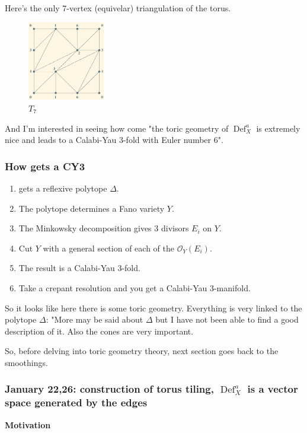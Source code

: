Here's the only 7-vertex (equivelar) triangulation of the torus.

\begin{figure}[H]
	\centering
	\includegraphics[width=0.3\textwidth]{fig1}
	\caption*{$T_7$}
\end{figure}

And I'm interested in seeing how come "the toric geometry of $\operatorname{Def}_{X}^a$ is extremely nice and leads to a Calabi-Yau 3-fold with Euler number 6".

\subsubsection{How \cite{jan1} gets a CY3}
\begin{enumerate}
\item \cite{jan1} gets a reflexive polytope $\Delta$.
\item The polytope determines a Fano variety $Y$.
\item The Minkowsky decomposition gives 3 divisors $E_i$ on $Y$.
\item Cut $Y$ with a general section of each of the $\mathcal{O}_Y(E_i)$.
\item The result is a Calabi-Yau 3-fold.
\item Take a crepant resolution and you get a Calabi-Yau 3-manifold.
\end{enumerate}

So it looks like here there is some toric geometry. Everything is very linked to the polytope $\Delta$: "More may be said about $\Delta$ but I have not been able to find a good description of it. Also the cones are very important.

So, before delving into toric geometry theory, next section goes back to the smoothings.

\subsubsection{January 22,26: construction of torus tiling, \(\operatorname{Def}_X^a\) is a vector space generated by the edges}
\textbf{Motivation}


